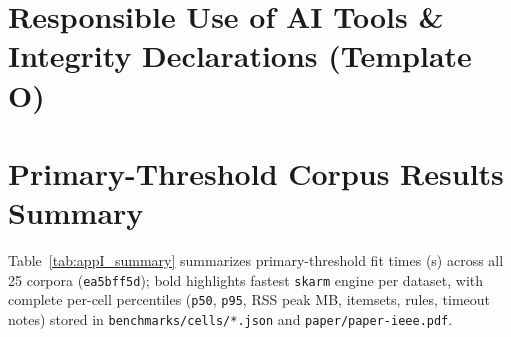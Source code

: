 \section{Responsible Use of AI Tools \& Integrity Declarations (Template O)}
\label{app:ai_integrity}
\begin{table}[ht!]
\centering
\caption{Responsible Use of AI and Digital Tools Disclosure (Template O).}
\fontsize{8.8}{11.5}\selectfont
{}
\end{table}

\clearpage
\section{Primary-Threshold Corpus Results Summary}
\label{app:corpus_summary}
Table~\ref{tab:appI_summary} summarizes primary-threshold fit times (s) across all 25 corpora (\texttt{ea5bff5d}); bold highlights fastest \texttt{skarm} engine per dataset, with complete per-cell percentiles (\texttt{p50}, \texttt{p95}, RSS peak MB, itemsets, rules, timeout notes) stored in \texttt{benchmarks/\protect\allowbreak{}cells/\protect\allowbreak{}*.json} and \texttt{paper/\protect\allowbreak{}paper-ieee.pdf}.

